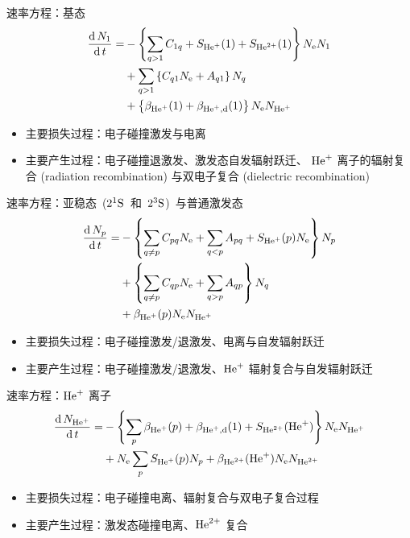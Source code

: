 \begin{CJK*}{UTF8}{kai}
\begin{frame}{速率方程：基态}
	\[
	\begin{aligned}
		\frac{{\rm d}\,N_1}{{\rm d}\,t}=
			&-\left\{\sum_{q>1}C_{1q}+S_{{\rm He}^+}(1)+S_{{\rm He}^{2+}}(1)\right\}N_{\rm e}N_1\\
			&+\sum_{q>1}\left\{C_{q1}N_{\rm e}+A_{q1}\right\}N_q\\
			&+\left\{\beta_{{\rm He}^+}(1)+\beta_{{\rm He}^+,\rm d}(1)\right\}N_{\rm e}N_{{\rm He}^+}
	\end{aligned}
	\]
	\begin{itemize}
		\item 主要损失过程：电子碰撞激发与电离
		\item 主要产生过程：电子碰撞退激发、激发态自发辐射跃迁、
			${\rm He}^+$ 离子的辐射复合 (radiation recombination)
			与双电子复合 (dielectric recombination)
	\end{itemize}
\end{frame}

\begin{frame}{速率方程：亚稳态~($2^1{\rm S}$~和~$2^3{\rm S}$)~与普通激发态}
	\[
	\begin{aligned}
		\frac{{\rm d}\,N_p}{{\rm d}\,t}=
		&-\left\{\sum_{q\ne p}C_{pq}N_{\rm e}+\sum_{q<p}A_{pq}+S_{{\rm He}^+}(p)N_{\rm e}\right\}N_p\\
		&+\left\{\sum_{q\ne p}C_{qp}N_{\rm e}+\sum_{q>p}A_{qp}\right\}N_q\\
		&+\beta_{{\rm He}^+}(p)N_{\rm e}N_{{\rm He}^+}
	\end{aligned}
	\]
	\begin{itemize}
		\item 主要损失过程：电子碰撞激发/退激发、电离与自发辐射跃迁
		\item 主要产生过程：电子碰撞激发/退激发、${\rm He}^+$ 辐射复合与自发辐射跃迁
	\end{itemize}
\end{frame}

\begin{frame}{速率方程：${\rm He}^+$ 离子}
	\[
	\begin{aligned}
		\frac{{\rm d}\,N_{{\rm He}^+}}{{\rm d}\,t}=
		&-\left\{\sum_{p}\beta_{{\rm He}^+}(p)+\beta_{{\rm He}^+,{\rm d}}(1)+S_{{\rm He}^{2+}}({\rm He}^+)\right\}N_{\rm e}N_{{\rm He}^+}\\
		&+N_{\rm e}\sum_{p}S_{{\rm He}^+}(p)N_p+\beta_{{\rm He}^{2+}}({\rm He}^{+})N_{\rm e}N_{{\rm He}^{2+}}
	\end{aligned}
	\]
	\begin{itemize}
		\item 主要损失过程：电子碰撞电离、辐射复合与双电子复合过程
		\item 主要产生过程：激发态碰撞电离、${\rm He}^{2+}$ 复合
	\end{itemize}
\end{frame}


\end{CJK*}
